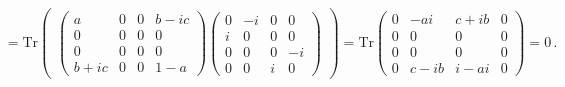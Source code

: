 \documentclass[11pt]{article}
\numberwithin{equation}{section} %
\numberwithin{figure}{section} %
\begin{document}
\begin{appendices}
\begin{equation}
\begin{split}
 &=\textrm{Tr}\begin{pmatrix}\begin{pmatrix}a&0&0&b-ic\\0&0&0&0\\0&0&0&0\\b+ic&0&0&1-a\end{pmatrix}\begin{pmatrix}0&-i&0&0\\i&0&0&0\\0&0&0&-i\\0&0&i&0\end{pmatrix}\end{pmatrix}=\textrm{Tr}\begin{pmatrix}0&-ai&c+ib&0\\0&0&0&0\\0&0&0&0\\0&c-ib&i-ai&0\end{pmatrix}=0\,\textrm{.}
\end{split}
\end{equation}

\vspace{1cm}

\end{appendices}
\end{document}
